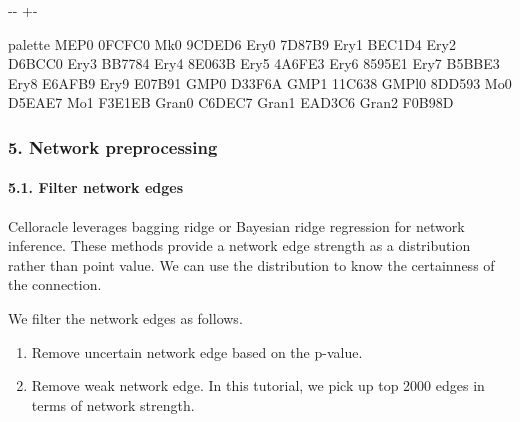 \documentclass[letterpaper,10pt,english]{sphinxmanual}
\newlength\nbsphinxcodecellspacing
\begin{document}
{

\kern-\sphinxverbatimsmallskipamount\kern-\baselineskip
\kern+\FrameHeightAdjust\kern-\fboxrule
\vspace{\nbsphinxcodecellspacing}

%
\begin{sphinxVerbatim}[commandchars=\\\{\}]
\llap{\color{nbsphinxout}[17]:\,\hspace{\fboxrule}\hspace{\fboxsep}}        palette
MEP\PYGZus{}0   \PYGZsh{}0FCFC0
Mk\PYGZus{}0    \PYGZsh{}9CDED6
Ery\PYGZus{}0   \PYGZsh{}7D87B9
Ery\PYGZus{}1   \PYGZsh{}BEC1D4
Ery\PYGZus{}2   \PYGZsh{}D6BCC0
Ery\PYGZus{}3   \PYGZsh{}BB7784
Ery\PYGZus{}4   \PYGZsh{}8E063B
Ery\PYGZus{}5   \PYGZsh{}4A6FE3
Ery\PYGZus{}6   \PYGZsh{}8595E1
Ery\PYGZus{}7   \PYGZsh{}B5BBE3
Ery\PYGZus{}8   \PYGZsh{}E6AFB9
Ery\PYGZus{}9   \PYGZsh{}E07B91
GMP\PYGZus{}0   \PYGZsh{}D33F6A
GMP\PYGZus{}1   \PYGZsh{}11C638
GMPl\PYGZus{}0  \PYGZsh{}8DD593
Mo\PYGZus{}0    \PYGZsh{}D5EAE7
Mo\PYGZus{}1    \PYGZsh{}F3E1EB
Gran\PYGZus{}0  \PYGZsh{}C6DEC7
Gran\PYGZus{}1  \PYGZsh{}EAD3C6
Gran\PYGZus{}2  \PYGZsh{}F0B98D
\end{sphinxVerbatim}
}


\subsubsection{5. Network preprocessing}
\label{\detokenize{notebooks/04_Network_analysis/Network_analysis_with_with_Paul_etal_2015_data:5.-Network-preprocessing}}

\paragraph{5.1. Filter network edges}
\label{\detokenize{notebooks/04_Network_analysis/Network_analysis_with_with_Paul_etal_2015_data:5.1.-Filter-network-edges}}
Celloracle leverages bagging ridge or Bayesian ridge regression for network inference. These methods provide a network edge strength as a distribution rather than point value. We can use the distribution to know the certainness of the connection.

We filter the network edges as follows.
\begin{enumerate}
\item {} 
Remove uncertain network edge based on the p-value.

\item {} 
Remove weak network edge. In this tutorial, we pick up top 2000 edges in terms of network strength.

\end{enumerate}
\end{document}
